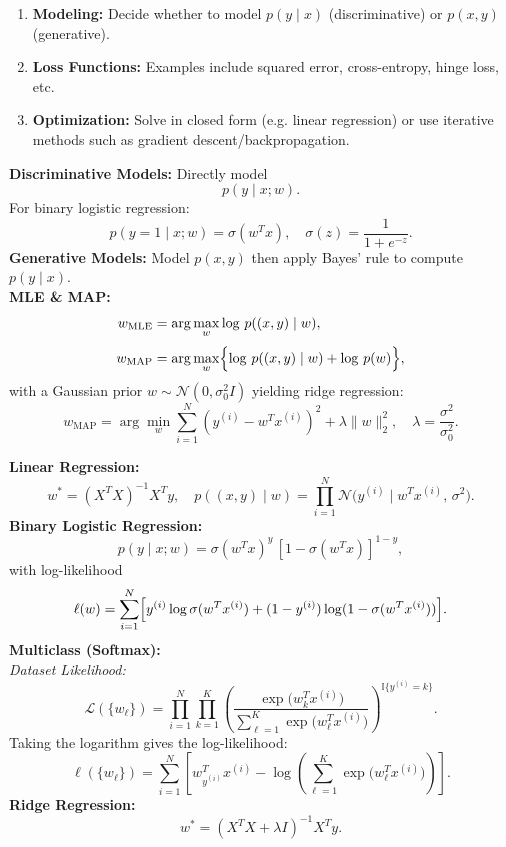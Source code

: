 \documentclass[10pt,landscape]{article}
\begin{document}
\footnotesize

\begin{multicols}{3}

\begin{tcolorbox}[breakable, title=Common Patterns Across Models]
\begin{enumerate}
    \item \textbf{Modeling:} Decide whether to model \(p(y\mid x)\) (discriminative) or \(p(x,y)\) (generative).\\[1mm]
    \item \textbf{Loss Functions:} Examples include squared error, cross-entropy, hinge loss, etc.\\[1mm]
    \item \textbf{Optimization:} Solve in closed form (e.g. linear regression) or use iterative methods such as gradient descent/backpropagation.\\[1mm] 
\end{enumerate}

\textbf{Discriminative Models:} Directly model
\[
p(y\mid x;w).
\]
For binary logistic regression:
\[
p(y=1\mid x;w)=\sigma(w^T x),\quad \sigma(z)=\frac{1}{1+e^{-z}}.
\]
\textbf{Generative Models:} Model \(p(x,y)\) then apply Bayes' rule to compute \(p(y\mid x)\).\\[1mm]
\textbf{MLE \& MAP:}\\
\[
\begin{aligned}
w_{\mathrm{MLE}} &= \arg\max_w \log\, p((x,y)\mid w),\\[1mm]
w_{\mathrm{MAP}} &= \arg\max_w \Bigl\{\log\, p((x,y)\mid w)+\log\, p(w)\Bigr\},
\end{aligned}
\]
with a Gaussian prior \(w\sim\mathcal{N}(0,\sigma_0^2 I)\) yielding ridge regression:
\[
w_{\mathrm{MAP}}=\arg\min_w \sum_{i=1}^N \left(y^{(i)}-w^T x^{(i)}\right)^2+\lambda\|w\|_2^2,\quad \lambda=\frac{\sigma^2}{\sigma_0^2}.
\]
\end{tcolorbox}

\begin{tcolorbox}[breakable, title=Optimal \(w\) \& Likelihood Functions]
\textbf{Linear Regression:}
\[
w^*=(X^T X)^{-1}X^Ty,\quad p((x,y)\mid w)=\prod_{i=1}^N \mathcal{N}\bigl(y^{(i)}\mid w^T x^{(i)},\,\sigma^2\bigr).
\]
\textbf{Binary Logistic Regression:}
\[
p(y\mid x;w)=\sigma(w^T x)^y\,[1-\sigma(w^T x)]^{1-y},
\]
with log-likelihood
\[
\ell(w)=\sum_{i=1}^N \Bigl[y^{(i)}\log\sigma(w^T x^{(i)})+(1-y^{(i)})\log(1-\sigma(w^T x^{(i)}))\Bigr].
\]
\textbf{Multiclass (Softmax):}\\[1mm]
\textit{Dataset Likelihood:}
\[
\mathcal{L}(\{w_\ell\}) = \prod_{i=1}^N \prod_{k=1}^K \left(\frac{\exp\bigl(w_k^T x^{(i)}\bigr)}{\sum_{\ell=1}^K \exp\bigl(w_\ell^T x^{(i)}\bigr)}\right)^{\mathbb{I}\{y^{(i)}=k\}}.
\]
Taking the logarithm gives the log-likelihood:
\[
\ell(\{w_\ell\}) = \sum_{i=1}^N \left[ w_{y^{(i)}}^T x^{(i)} - \log\left(\sum_{\ell=1}^K \exp\bigl(w_\ell^T x^{(i)}\bigr)\right) \right].
\]
\textbf{Ridge Regression:}
\[
w^*=(X^TX+\lambda I)^{-1}X^Ty.
\]
\end{tcolorbox}


\end{multicols}
\end{document}
